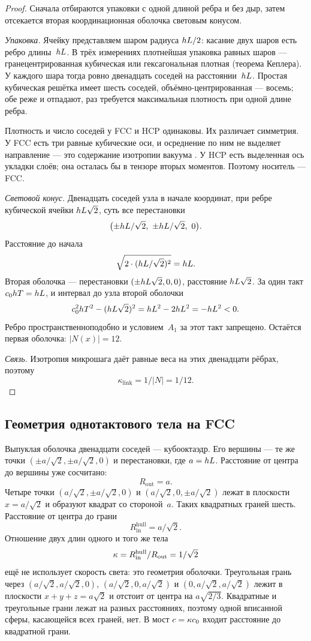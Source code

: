 \begin{proof}
Сначала отбираются упаковки с одной длиной ребра и без дыр, затем отсекается вторая координационная оболочка световым конусом.

\emph{Упаковка.}
Ячейку представляем шаром радиуса $hL/2$: касание двух шаров есть ребро длины~$hL$.
В трёх измерениях плотнейшая упаковка равных шаров --- гранецентрированная кубическая или гексагональная плотная (теорема Кеплера).
У каждого шара тогда ровно двенадцать соседей на расстоянии~$hL$.
Простая кубическая решётка имеет шесть соседей, объёмно-центрированная --- восемь; обе реже и отпадают, раз требуется максимальная плотность при одной длине ребра.

Плотность и число соседей у FCC и HCP одинаковы.
Их различает симметрия.
У FCC есть три равные кубические оси, и осреднение по ним не выделяет направление --- это содержание изотропии вакуума .
У HCP есть выделенная ось укладки слоёв; она осталась бы в тензоре вторых моментов.
Поэтому носитель --- FCC.

\emph{Световой конус.}
Двенадцать соседей узла в начале координат, при ребре кубической ячейки $hL\sqrt{2}$, суть все перестановки
\[
  \bigl(\pm\hl/\sqrt{2},\ \pm\hl/\sqrt{2},\ 0\bigr).
\]
Расстояние до начала
\[
  \sqrt{2\cdot(hL/\sqrt{2})^2}=hL.
\]
Вторая оболочка --- перестановки $(\pm hL\sqrt{2},0,0)$, расстояние $hL\sqrt{2}$.
За один такт $c_0hT=hL$, и интервал до узла второй оболочки
\[
  c_0^2hT^2-(hL\sqrt{2})^2=hL^2-2hL^2=-hL^2<0.
\]
Ребро пространственноподобно и условием~$A_1$ за этот такт запрещено.
Остаётся первая оболочка: $|N(x)|=12$.

\emph{Связь.}
Изотропия микрошага даёт равные веса на этих двенадцати рёбрах, поэтому
\[
  \kappa_{\mathrm{link}}=1/|N|=1/12.
\]
\end{proof}

\subsection{Геометрия однотактового тела на FCC}
\label{sec:fcc-kappa}

Выпуклая оболочка двенадцати соседей --- кубооктаэдр.
Его вершины --- те же точки $(\pm a/\sqrt{2},\pm a/\sqrt{2},0)$ и перестановки, где $a=hL$.
Расстояние от центра до вершины уже сосчитано:
\[
  R_{\mathrm{out}}=a.
\]
Четыре точки $(a/\sqrt{2},\pm a/\sqrt{2},0)$ и $(a/\sqrt{2},0,\pm a/\sqrt{2})$ лежат в плоскости $x=a/\sqrt{2}$ и образуют квадрат со стороной~$a$.
Таких квадратных граней шесть.
Расстояние от центра до грани
\[
  R_{\mathrm{in}}^{\mathrm{hull}}=a/\sqrt{2}.
\]
Отношение двух длин одного и того же тела
\[
  \kappa=R_{\mathrm{in}}^{\mathrm{hull}}/R_{\mathrm{out}}=1/\sqrt{2}
\]
ещё не использует скорость света: это геометрия оболочки.
Треугольная грань через $(a/\sqrt{2},a/\sqrt{2},0)$, $(a/\sqrt{2},0,a/\sqrt{2})$ и $(0,a/\sqrt{2},a/\sqrt{2})$ лежит в плоскости $x+y+z=a\sqrt{2}$ и отстоит от центра на $a\sqrt{2/3}$.
Квадратные и треугольные грани лежат на разных расстояниях, поэтому одной вписанной сферы, касающейся всех граней, нет.
В мост $c=\kappa c_0$ входит расстояние до квадратной грани.


